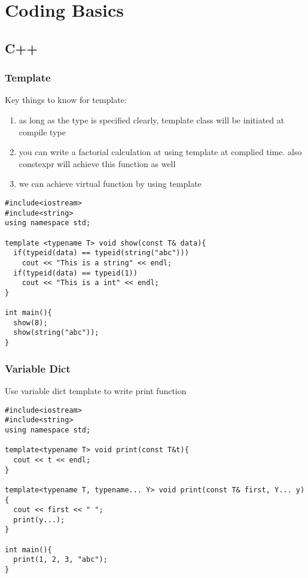 \section{Coding Basics}
\subsection{C++}
\subsubsection{Template}

Key things to know for template:
\begin{enumerate}
\item as long as the type is specified clearly, template class will be initiated at compile type
\item you can write a factorial calculation at using template at complied time. also {\color{blue}constexpr} will achieve this function as well
\item we can achieve virtual function by using template
\end{enumerate}

\begin{lstlisting}
#include<iostream>
#include<string>
using namespace std;

template <typename T> void show(const T& data){
  if(typeid(data) == typeid(string("abc")))
    cout << "This is a string" << endl;
  if(typeid(data) == typeid(1))
    cout << "This is a int" << endl;
}

int main(){
  show(8);
  show(string("abc"));
}
\end{lstlisting}

\subsubsection{Variable Dict}

Use variable dict template to write print function

\begin{lstlisting}
#include<iostream>
#include<string>
using namespace std;

template<typename T> void print(const T&t){
  cout << t << endl;
}

template<typename T, typename... Y> void print(const T& first, Y... y){
  cout << first << " ";
  print(y...);
}

int main(){
  print(1, 2, 3, "abc");
}
\end{lstlisting}

